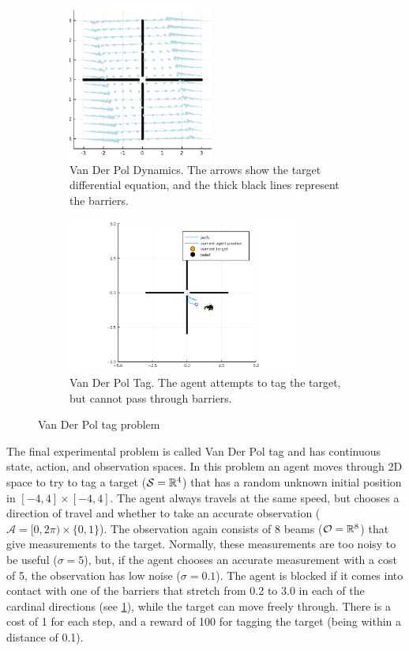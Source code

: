 \begin{figure}[bth]
    \begin{subfigure}{0.48\linewidth}
        \centering
        \includegraphics[height=2in]{media/vdp_quiver.pdf}
        \caption{Van Der Pol Dynamics. The arrows show the target differential equation, and the thick black lines represent the barriers.}
    \end{subfigure}
    \hfill
    \begin{subfigure}{0.48\linewidth}
        \includegraphics[height=2in]{media/vdptag.png}
        \caption{Van Der Pol Tag. The agent attempts to tag the target, but cannot pass through barriers.}
    \end{subfigure}
    \caption[Van Der Pol tag problem]{Van Der Pol tag problem}
    \label{fig:vdp}
\end{figure}


The final experimental problem is called Van Der Pol tag and has continuous state, action, and observation spaces.
In this problem an agent moves through 2D space to try to tag a target ($\mathcal{S}=\mathbb{R}^4$) that has a random unknown initial position in $[-4, 4]\times[-4,4]$.
The agent always travels at the same speed, but chooses a direction of travel and whether to take an accurate observation ($\mathcal{A} = [0, 2\pi)\times\{0,1\}$).
The observation again consists of 8 beams ($\mathcal{O}=\mathbb{R}^8$) that give measurements to the target.
Normally, these measurements are too noisy to be useful ($\sigma=5$), but, if the agent chooses an accurate measurement with a cost of \num{5}, the observation has low noise ($\sigma=0.1$).
The agent is blocked if it comes into contact with one of the barriers that stretch from \num{0.2} to \num{3.0} in each of the cardinal directions (see \cref{fig:vdp}), while the target can move freely through.
There is a cost of \num{1} for each step, and a reward of \num{100} for tagging the target (being within a distance of \num{0.1}).


